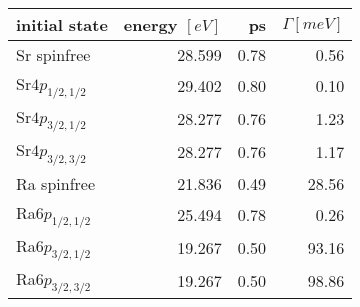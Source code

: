 \begin{table}[h]
 \centering
 \caption{}
 \begin{tabular}{lrrr}
  \toprule
   initial state    & energy $[\unit{eV}]$ & ps & $\Gamma [\unit{meV}]$\\
  \midrule
   Sr spinfree      & 28.599 & 0.78 &   0.56\\  
   Sr$4p_{1/2,1/2}$ & 29.402 & 0.80 &   0.10\\
   Sr$4p_{3/2,1/2}$ & 28.277 & 0.76 &   1.23\\
   Sr$4p_{3/2,3/2}$ & 28.277 & 0.76 &   1.17\\
  \midrule
   Ra spinfree      & 21.836 & 0.49 &  28.56 \\  
   Ra$6p_{1/2,1/2}$ & 25.494 & 0.78 &   0.26\\
   Ra$6p_{3/2,1/2}$ & 19.267 & 0.50 &  93.16 \\
   Ra$6p_{3/2,3/2}$ & 19.267 & 0.50 &  98.86\\
  \bottomrule
 \end{tabular}
 \label{tab:widths}
\end{table}
